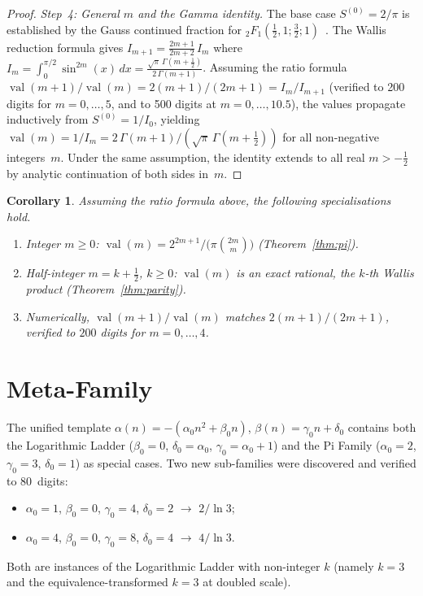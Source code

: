 \documentclass[11pt,a4paper]{article}
\newtheorem{corollary}[theorem]{Corollary}
\theoremstyle{definition}
\theoremstyle{remark}
\begin{document}
\begin{proof}
\emph{Step~4: General $m$ and the Gamma identity.}
The base case $S^{(0)} = 2/\pi$ is established by the Gauss
continued fraction for ${}_2F_1(\tfrac{1}{2},1;\tfrac{3}{2};1)$~\cite{wall1948}.
The Wallis reduction formula gives
$I_{m+1} = \frac{2m{+}1}{2m{+}2}\,I_m$
where $I_m = \int_0^{\pi/2}\sin^{2m}(x)\,dx
= \frac{\sqrt{\pi}\,\Gamma(m{+}\frac{1}{2})}{2\,\Gamma(m{+}1)}$.
Assuming the ratio formula
$\operatorname{val}(m{+}1)/\operatorname{val}(m)
= 2(m{+}1)/(2m{+}1) = I_m/I_{m+1}$
(verified to 200 digits for $m = 0, \ldots, 5$, and to 500 digits
at $m = 0, \ldots, 10.5$),
the values propagate inductively from $S^{(0)} = 1/I_0$,
yielding $\operatorname{val}(m) = 1/I_m =
2\,\Gamma(m{+}1)/(\sqrt{\pi}\,\Gamma(m{+}\tfrac{1}{2}))$
for all non-negative integers~$m$.
Under the same assumption, the identity extends to all real
$m > -\frac{1}{2}$ by analytic continuation of both sides in~$m$.
\end{proof}

\begin{corollary}\label{cor:specialisations}
Assuming the ratio formula above, the following specialisations hold.
\begin{enumerate}
\item[\textup{(i)}] Integer $m \ge 0$: $\operatorname{val}(m) = 2^{2m+1}/\bigl(\pi\binom{2m}{m}\bigr)$
  \textup{(Theorem~\ref{thm:pi})}.
\item[\textup{(ii)}] Half-integer $m = k+\tfrac{1}{2}$, $k \ge 0$:
  $\operatorname{val}(m)$ is an exact rational, the $k$-th Wallis product
  \textup{(Theorem~\ref{thm:parity})}.
\item[\textup{(iii)}] Numerically,
  $\operatorname{val}(m{+}1)/\operatorname{val}(m)$ matches
  $2(m{+}1)/(2m{+}1)$, verified to $200$ digits for $m=0,\ldots,4$.
\end{enumerate}
\end{corollary}

\section{Meta-Family}\label{sec:meta}

The unified template $\alpha(n) = -(\alpha_0 n^2 + \beta_0 n)$, $\beta(n) = \gamma_0 n + \delta_0$
contains both the Logarithmic Ladder ($\beta_0 = 0$, $\delta_0 = \alpha_0$, $\gamma_0 = \alpha_0 + 1$)
and the Pi Family ($\alpha_0 = 2$, $\gamma_0 = 3$, $\delta_0 = 1$) as special cases.
Two new sub-families were discovered and verified to 80~digits:
\begin{itemize}
  \item $\alpha_0 = 1$, $\beta_0 = 0$, $\gamma_0 = 4$, $\delta_0 = 2$ $\to$ $2/\ln 3$;
  \item $\alpha_0 = 4$, $\beta_0 = 0$, $\gamma_0 = 8$, $\delta_0 = 4$ $\to$ $4/\ln 3$.
\end{itemize}
Both are instances of the Logarithmic Ladder with non-integer $k$
(namely $k = 3$ and the equivalence-transformed $k = 3$ at doubled scale).
\end{document}
